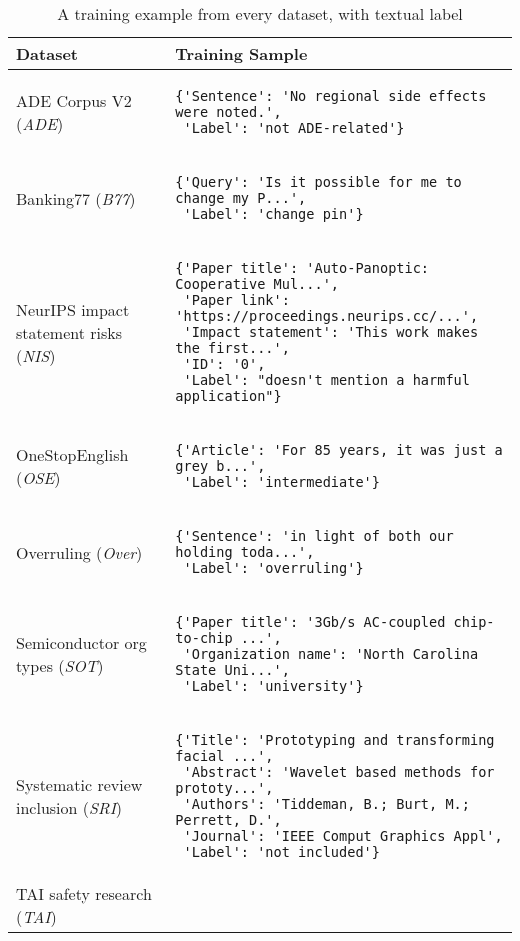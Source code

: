 \documentclass{article}
\begin{document}
\begin{table}[ht]
\caption{A training example from every dataset, with textual label}
\centering
\begin{tabular}{m{7em}l}\toprule
\textbf{Dataset} & \textbf{Training Sample} \\
\midrule
ADE Corpus V2 (\textit{ADE}) & \begin{lstlisting}
{'Sentence': 'No regional side effects were noted.', 
 'Label': 'not ADE-related'}
\end{lstlisting} \\
Banking77 (\textit{B77}) & \begin{lstlisting}
{'Query': 'Is it possible for me to change my P...',
 'Label': 'change_pin'}
\end{lstlisting} \\
NeurIPS impact statement risks (\textit{NIS}) & \begin{lstlisting}
{'Paper title': 'Auto-Panoptic: Cooperative Mul...',
 'Paper link': 'https://proceedings.neurips.cc/...',
 'Impact statement': 'This work makes the first...',
 'ID': '0',
 'Label': "doesn't mention a harmful application"}
\end{lstlisting} \\
OneStopEnglish (\textit{OSE}) & \begin{lstlisting}
{'Article': 'For 85 years, it was just a grey b...', 
 'Label': 'intermediate'}
\end{lstlisting} \\
Overruling (\textit{Over}) & \begin{lstlisting}
{'Sentence': 'in light of both our holding toda...',
 'Label': 'overruling'}
\end{lstlisting} \\
Semiconductor org types (\textit{SOT}) & \begin{lstlisting}
{'Paper title': '3Gb/s AC-coupled chip-to-chip ...', 
 'Organization name': 'North Carolina State Uni...', 
 'Label': 'university'}
\end{lstlisting} \\
Systematic review inclusion (\textit{SRI}) & \begin{lstlisting}
{'Title': 'Prototyping and transforming facial ...',
 'Abstract': 'Wavelet based methods for prototy...',
 'Authors': 'Tiddeman, B.; Burt, M.; Perrett, D.',
 'Journal': 'IEEE Comput Graphics Appl',
 'Label': 'not included'}
\end{lstlisting} \\
TAI safety research (\textit{TAI}) & \begin{lstlisting}

\end{lstlisting}
\end{tabular}
\end{table}
\end{document}
